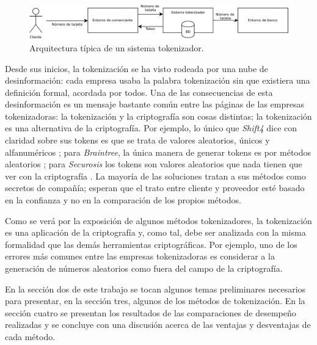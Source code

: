 \begin{figure}
  \centering
  \includegraphics[width=0.8\linewidth]
    {algoritmos_tokenizadores/diagramas/sistema_tokenizador.png}
  \caption{Arquitectura típica de un sistema tokenizador.}
  \label{figura:arquitectura_tokenizacion}
\end{figure}


Desde sus inicios, la tokenización se ha visto rodeada por una nube de
desinformación: cada empresa usaba la palabra tokenización sin que existiera una
definición formal, acordada por todos. Una de las consecuencias de esta
desinformación es un mensaje bastante común entre las páginas de las empresas
tokenizadoras: la tokenización y la criptografía son cosas distintas; la
tokenización es una alternativa de la criptografía. Por ejemplo, lo único que
\textit{Shift4} dice con claridad sobre sus tokens es que se trata de valores
aleatorios, únicos y alfanuméricos \cite{shif4_uno} \cite{shif4_dos}; para
\textit{Braintree}, la única manera de generar tokens es por métodos aleatorios
\cite{braintree_uno}; para \textit{Securosis} los tokens son valores aleatorios
que nada tienen que ver con la criptografía \cite{securosis}. La mayoría de las
soluciones tratan a sus métodos como secretos de compañía; esperan que el trato
entre cliente y proveedor esté basado en la confianza y no en la comparación de
los propios métodos.


Como se verá por la exposición de algunos métodos tokenizadores, la tokenización
es una aplicación de la criptografía y, como tal, debe ser analizada con la
misma formalidad que las demás herramientas criptográficas. Por ejemplo, uno de
los errores más comunes entre las empresas tokenizadoras es considerar a la
generación de números aleatorios como fuera del campo de la criptografía.


En la sección dos de este trabajo se tocan algunos temas preliminares necesarios
para presentar, en la sección tres, algunos de los métodos de tokenización. En la
sección cuatro se presentan los resultados de las comparaciones de desempeño
realizadas y se concluye con una discusión acerca de las ventajas y desventajas
de cada método.
